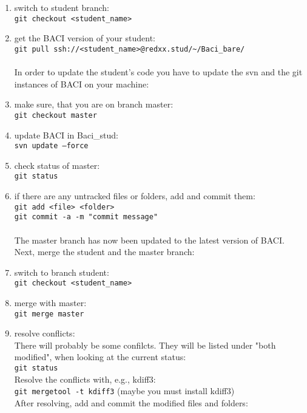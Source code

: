   \begin{enumerate}
   \item switch to student branch:\\
   \texttt{git checkout <student\_name>}
   \item get the BACI version of your student:\\
   \texttt{git pull ssh://<student\_name>@redxx.stud/\~{}/Baci\_bare/}\\\\
   In order to update the student's code you have to update the svn and the git instances of BACI on your machine:\\
    \item make sure, that you are on branch master:\\
    \texttt{git checkout master}
    \item update BACI in Baci\_stud:\\
    \texttt{svn update --force}
    \item check status of master:\\
    \texttt{git status}
    \item if there are any untracked files or folders, add and commit them:\\
    \texttt{git add <file> <folder>}\\
    \texttt{git commit -a -m "commit message"}\\\\
    The master branch has now been updated to the latest version of BACI. Next, merge the student and the master branch:\\
    \item switch to branch student:\\
    \texttt{git checkout <student\_name>}
    \item merge with master:\\
    \texttt{git merge master}\\
    \item resolve conflicts:\\
    There will probably be some confilcts. They will be listed under "both modified", when looking at the current status:\\
    \texttt{git status}\\
    Resolve the conflicts with, e.g., kdiff3:\\
    \texttt{git mergetool -t kdiff3} (maybe you must install kdiff3)\\
    After resolving, add and commit the modified files and folders:\\

\end{enumerate}

